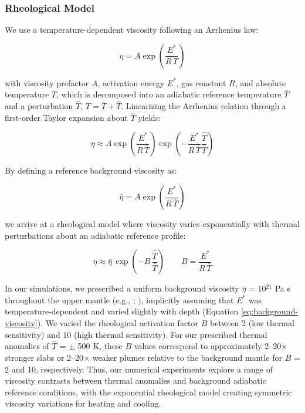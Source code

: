 \documentclass[
  paper=a4,
  ,captions=tableheading
]{scrartcl}
\begin{document}
\subsubsection{Rheological Model}\label{sec:rheological-model}

We use a temperature-dependent viscosity following an Arrhenius law:

\begin{equation}
  \eta = A \exp\!\left(\frac{E^{\ast}}{R\,T}\right)
  \label{eq:arrhenius-viscosity}
\end{equation}

with viscosity prefactor \(A\), activation energy \(E^{\ast}\), gas
constant \(R\), and absolute temperature \(T\), which is decomposed into
an adiabatic reference temperature \(\bar{T}\) and a perturbation
\(\hat{T}\), \(T=\bar{T}+\hat{T}\). Linearizing the Arrhenius relation
through a first-order Taylor expansion about \(\bar{T}\) yields:

\begin{equation}
  \eta \approx A \exp\!\left(\frac{E^{\ast}}{R\,\bar{T}}\right) \exp\!\left(-\frac{E^{\ast}}{R\,\bar{T}}\frac{\hat{T}}{\bar{T}}\right)
  \label{eq:arrhenius-viscosity-expanded}
\end{equation}

By defining a reference background viscosity as:

\begin{equation}
  \bar{\eta} = A \exp\!\left(\frac{E^{\ast}}{R\,\bar{T}}\right)
  \label{eq:background-viscosity}
\end{equation}

we arrive at a rheological model where viscosity varies exponentially
with thermal perturbations about an adiabatic reference profile:

\begin{equation}
  \eta \approx \bar{\eta}\,\exp\!\left(-B\,\frac{\hat{T}}{\bar{T}}\right) \qquad B=\frac{E^{\ast}}{R\,\bar{T}}
  \label{eq:rheological-model}
\end{equation}

In our simulations, we prescribed a uniform background viscosity
\(\bar{\eta}\) = 10\(^{21}\) Pa s throughout the upper mantle (e.g.,
;
), implicitly assuming that
\(E^{\ast}\) was temperature-dependent and varied slightly with depth
(Equation \ref{eq:background-viscosity}). We varied the rheological
activation factor \(B\) between 2 (low thermal sensitivity) and 10 (high
thermal sensitivity). For our prescribed thermal anomalies of
\(\hat{T}\) = \(\pm\) 500 K, these \(B\) values correspond to
approximately 2--20\(\times\) stronger slabs or 2--20\(\times\) weaker
plumes relative to the background mantle for \(B\) = 2 and 10,
respectively. Thus, our numerical experiments explore a range of
viscosity contrasts between thermal anomalies and background adiabatic
reference conditions, with the exponential rheological model creating
symmetric viscosity variations for heating and cooling.
\end{document}
